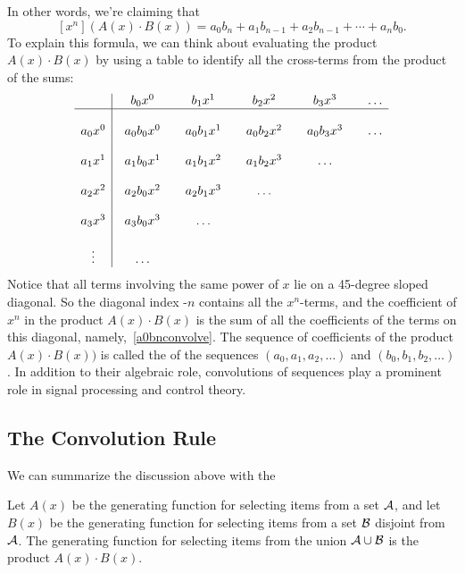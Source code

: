 In other words, we're claiming that
\begin{equation}\label{xnAxBx}
[x^n](A(x)\cdot B(x)) = a_0b_n + a_1b_{n-1} + a_2b_{n-1} + \cdots + a_nb_0.
\end{equation}
To explain this formula, we can think about evaluating the product
$A(x) \cdot B(x)$ by using a table to identify all the cross-terms
from the product of the sums:
%
\[
\begin{array}{c|@{\quad}c@{\qquad}c@{\qquad}c@{\qquad}c@{\qquad}c}
      & b_0 x^0 & b_1 x^1 & b_2 x^2 & b_3 x^3 & \dots \\
\hline
\\
a_0 x^0 & a_0 b_0 x^0 & a_0 b_1 x^1 & a_0 b_2 x^2 & a_0 b_3 x^3 & \dots \\
\\
a_1 x^1 & a_1 b_0 x^1 & a_1 b_1 x^2 & a_1 b_2 x^3 & \dots \\
\\
a_2 x^2 & a_2 b_0 x^2 & a_2 b_1 x^3 & \dots \\
\\
a_3 x^3 & a_3 b_0 x^3 & \dots \\
\\
\vdots & \dots\\
\end{array}
\]
Notice that all terms involving the same power of $x$ lie on a
45-degree sloped diagonal.  So the diagonal index -$n$ contains all
the $x^n$-terms, and the coefficient of $x^n$ in the product
$A(x)\cdot B(x)$ is the sum of all the coefficients of the terms on
this diagonal, namely,~\eqref{a0bnconvolve}.  The sequence of
coefficients of the product $A(x)\cdot B(x))$ is called the
 of the sequences $(a_0, a_1, a_2, \dots)$ and
$(b_0, b_1, b_2, \dots)$.  In addition to their algebraic role,
convolutions of sequences play a prominent role in signal processing
and control theory.

\subsection{The Convolution Rule}

We can summarize the discussion above with the
\begin{mathrule*}\label{convolution_rule}
Let $A(x)$ be the generating function for selecting items from a set
${\cal A}$, and let $B(x)$ be the generating function for selecting
items from a set ${\cal B}$ disjoint from ${\cal A}$.  The generating
function for selecting items from the union ${\cal A} \cup {\cal B}$
is the product $A(x) \cdot B(x)$.
\end{mathrule*}

